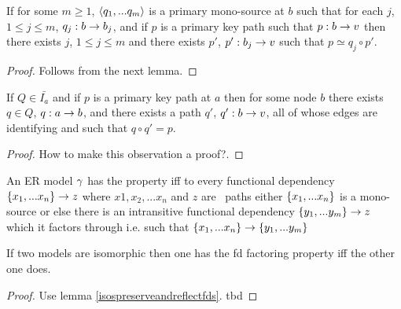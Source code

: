 \begin{lemma}
If for some $m \geq 1$, $\langle q_1,...q_m\rangle$ is a primary mono-source at $b$ such that for each $j$, $1 \leq j \leq m$, $q_j : b \rightarrow b_j$,
and if  $p$ is a primary key path such that $p: b \rightarrow v$   
then there exists $j$, $1 \leq j \leq m$ and there exists $p'$, $p': b_j \rightarrow v$ such that $p \simeq q_j \circ p'$.
\end{lemma}
\begin{proof}
Follows from the next lemma.
\end{proof}

\begin{lemma}
If $Q \in \bar{I_a}$ and if $p$ is a primary key path at $a$ then for some node $b$ there exists $q \in Q$, $q: a \rightarrow b$, and there exists 
a path $q'$, $q': b \rightarrow v$,  all of whose edges are identifying and such that $q \circ q' = p$. 
\end{lemma}
\begin{proof}
How to make this observation a proof?.
\end{proof}

\begin{definition}
\noindent An ER model $\gamma$ has the \term{\fdfactoring} property iff to every functional dependency $\left\{x_1,...x_n\right\} \rightarrow z$ where $x1, x_2, ... x_n$ and $z$ are \attributelike\ paths either $\left\{x_1,...x_n\right\}$ is
a mono-source or else there is an intransitive functional dependency $\left\{y_1,...y_m\right\} \rightarrow z$ which it factors through i.e. such that $\left\{x_1,...x_n\right\} \rightarrow \left\{y_1,...y_m\right\}$
\end{definition}

\begin{lemma}
\label{fdfactoringcarrythroughlemma}
If two models are isomorphic then one has the fd factoring property iff the other one does.
\end{lemma}
\begin{proof}
Use lemma \ref{isospreserveandreflectfds}.
\vspace{0.5cm}
tbd
\end{proof}


